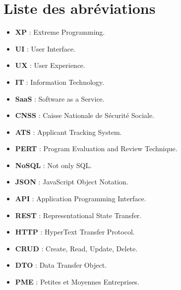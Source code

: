 \chapter*{Liste des abréviations}

\begin{itemize}[label={}]
\item \textbf{XP} : Extreme Programming.
\item \textbf{UI} : User Interface. 
\item \textbf{UX} : User Experience. 
\item \textbf{IT} : Information Technology.
\item \textbf{SaaS} : Software as a Service.
\item \textbf{CNSS} : Caisse Nationale de Sécurité Sociale.
\item \textbf{ATS} : Applicant Tracking System.
\item \textbf{PERT} : Program Evaluation and Review Technique.
\item \textbf{NoSQL} : Not only SQL.
\item \textbf{JSON} : JavaScript Object Notation.
\item \textbf{API} : Application Programming Interface.
\item \textbf{REST} : Representational State Transfer.
\item \textbf{HTTP} : HyperText Transfer Protocol.
\item \textbf{CRUD} : Create, Read, Update, Delete.
\item \textbf{DTO} : Data Transfer Object.
\item \textbf{PME} : Petites et Moyennes Entreprises.

 
\end{itemize}
